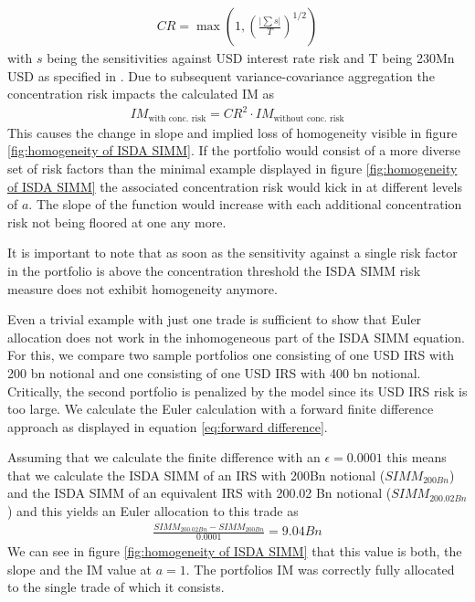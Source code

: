 \documentclass[../Thesis_AHoecherl.tex]{subfiles}
\begin{document}
    \begin{align*}
        CR = \max\left(1,\left(\frac{\lvert\sum{s}\rvert}{T}\right)^{1/2}\right)
    \end{align*}
    with $s$ being the sensitivities against USD interest rate risk and T being 230Mn USD as specified in \cite[Article 74]{SIMM}. Due to subsequent variance-covariance aggregation the concentration risk impacts the calculated IM as
    \begin{align*}
        IM_{\text{with conc. risk}} = CR^2 \cdot IM_{\text{without conc. risk}}
    \end{align*}
    This causes the change in slope and implied loss of homogeneity visible in figure \ref{fig:homogeneity of ISDA SIMM}. If the portfolio would consist of a more diverse set of risk factors than the minimal example displayed in figure \ref{fig:homogeneity of ISDA SIMM} the associated concentration risk would kick in at different levels of $a$.
    The slope of the function would increase with each additional concentration risk not being floored at one any more. 
    
    It is important to note that as soon as the sensitivity against a single risk factor in the portfolio is above the concentration threshold the ISDA SIMM risk measure does not exhibit homogeneity anymore.
    
    Even a trivial example with just one trade is sufficient to show that Euler allocation does not work in the inhomogeneous part of the ISDA SIMM equation.
    For this, we compare two sample portfolios one consisting of one USD IRS with 200 bn notional and one consisting of one USD IRS with 400 bn notional.
    Critically, the second portfolio is penalized by the model since its USD IRS risk is too large. We calculate the Euler calculation with a forward finite difference approach as displayed in equation \ref{eq:forward difference}.
    
    Assuming that we calculate the finite difference with an $\epsilon = 0.0001$ this means that we calculate the ISDA SIMM of an IRS with 200Bn notional ($SIMM_{200Bn}$) and the ISDA SIMM of an equivalent IRS with 200.02 Bn notional ($SIMM_{200.02Bn}$) and this yields an Euler allocation to this trade as
    \begin{align*}
        \frac{SIMM_{200.02Bn} - SIMM_{200Bn}}{0.0001} = 9.04Bn
    \end{align*}
    We can see in figure \ref{fig:homogeneity of ISDA SIMM} that this value is both, the slope and the IM value at $a = 1$. The portfolios IM was correctly fully allocated to the single trade of which it consists. 
    
\end{document}

